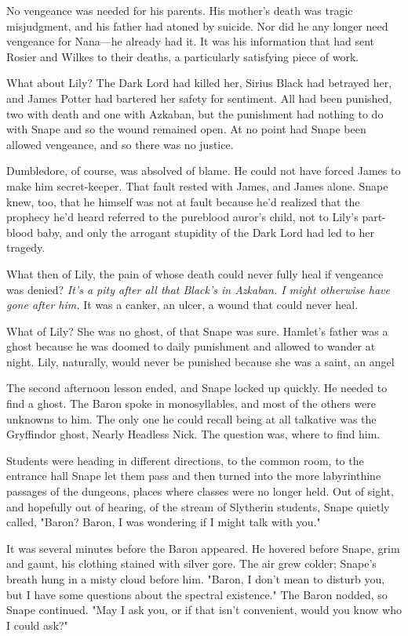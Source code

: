 No vengeance was needed for his parents. His mother's death was tragic misjudgment, and his father had atoned by suicide. Nor did he any longer need vengeance for Nana—he already had it. It was his information that had sent Rosier and Wilkes to their deaths, a particularly satisfying piece of work.

What about Lily? The Dark Lord had killed her, Sirius Black had betrayed her, and James Potter had bartered her safety for sentiment. All had been punished, two with death and one with Azkaban, but the punishment had nothing to do with Snape and so the wound remained open. At no point had Snape been allowed vengeance, and so there was no justice.

Dumbledore, of course, was absolved of blame. He could not have forced James to make him secret-keeper. That fault rested with James, and James alone. Snape knew, too, that he himself was not at fault because he'd realized that the prophecy he'd heard referred to the pureblood auror's child, not to Lily's part-blood baby, and only the arrogant stupidity of the Dark Lord had led to her tragedy.

What then of Lily, the pain of whose death could never fully heal if vengeance was denied? \emph{It's a pity after all that Black's in Azkaban. I might otherwise have gone after him.} It was a canker, an ulcer, a wound that could never heal.

What of Lily? She was no ghost, of that Snape was sure. Hamlet's father was a ghost because he was doomed to daily punishment and allowed to wander at night. Lily, naturally, would never be punished because she was a saint, an angel{\el}

The second afternoon lesson ended, and Snape locked up quickly. He needed to find a ghost. The Baron spoke in monosyllables, and most of the others were unknowns to him. The only one he could recall being at all talkative was the Gryffindor ghost, Nearly Headless Nick. The question was, where to find him.

Students were heading in different directions, to the common room, to the entrance hall{\el} Snape let them pass and then turned into the more labyrinthine passages of the dungeons, places where classes were no longer held. Out of sight, and hopefully out of hearing, of the stream of Slytherin students, Snape quietly called, "Baron? Baron, I was wondering if I might talk with you."

It was several minutes before the Baron appeared. He hovered before Snape, grim and gaunt, his clothing stained with silver gore. The air grew colder; Snape's breath hung in a misty cloud before him. "Baron, I don't mean to disturb you, but I have some questions about the spectral existence." The Baron nodded, so Snape continued. "May I ask you, or if that isn't convenient, would you know who I could ask?"

